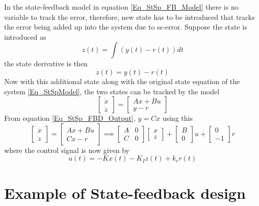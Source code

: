 In the state-feedback model in equation \eqref{Eq_StSp_FB_Model} there is no variable to track the error, therefore, new state has to be introduced that tracks the error being added up into the system due to ss-error. Suppose the state is introduced as
\begin{equation}
	z(t) = \int (y(t) - r(t)) dt
\end{equation}
the state derivative is then
\begin{equation}
	\dot{z}(t) = y(t) - r(t)
\end{equation}
Now with this additional state along with the original state equation of the system \eqref{Eq_StSpModel}, the two states can be tracked by the model
\begin{equation}
	\begin{bmatrix}
		\dot{x} \\ \dot{z}
	\end{bmatrix} = \begin{bmatrix}
		Ax + Bu \\ y - r
	\end{bmatrix}
\end{equation}
From equation \eqref{Eq_StSp_FBD_Output}, $y = Cx$ using this
\begin{equation}
	\begin{bmatrix}
	\dot{x} \\ \dot{z}
	\end{bmatrix} = \begin{bmatrix}
	Ax + Bu \\ Cx - r
	\end{bmatrix} \implies \begin{bmatrix}
		A & 0 \\ C & 0
	\end{bmatrix} \begin{bmatrix}
	{x} \\ {z}
	\end{bmatrix} + \begin{bmatrix}
		B \\ 0
	\end{bmatrix} u + \begin{bmatrix}
		0 \\ -1
	\end{bmatrix} r
\end{equation}
where the control signal is now given by
\begin{equation}
	u(t) = -Kx(t) - K_I z(t) + k_r r(t)
\end{equation}

\section{Example of State-feedback design} \label{Example_SingleTrackModel}

